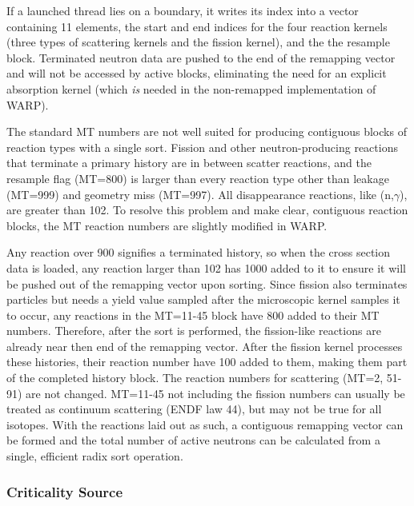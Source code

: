 If a launched thread lies on a boundary, it writes its index into a vector containing 11 elements, the start and end indices for the four reaction kernels (three types of scattering kernels and the fission kernel), and the the resample block.  Terminated neutron data are pushed to the end of the remapping vector and will not be accessed by active blocks, eliminating the need for an explicit absorption kernel (which \emph{is} needed in the non-remapped implementation of WARP).

The standard MT numbers are not well suited for producing contiguous blocks of reaction types with a single sort.  Fission and other neutron-producing reactions that terminate a primary history are in between scatter reactions, and the resample flag (MT=800) is larger than every reaction type other than leakage (MT=999) and geometry miss (MT=997).  All disappearance reactions, like (n,$\gamma$), are greater than 102.  To resolve this problem and make clear, contiguous reaction blocks, the MT reaction numbers are slightly modified in WARP.  

Any reaction over 900 signifies a terminated history, so when the cross section data is loaded, any reaction larger than 102 has 1000 added to it to ensure it will be pushed out of the remapping vector upon sorting.  Since fission also terminates particles but needs a yield value sampled after the microscopic kernel samples it to occur, any reactions in the MT=11-45 block have 800 added to their MT numbers.  Therefore, after the sort is performed, the fission-like reactions are already near then end of the remapping vector.  After the fission kernel processes these histories, their reaction number have 100 added to them, making them part of the completed history block.  The reaction numbers for scattering (MT=2, 51-91) are not changed. MT=11-45 not including the fission numbers can usually be treated as continuum scattering (ENDF law 44), but may not be true for all isotopes. With the reactions laid out as such, a contiguous remapping vector can be formed and the total number of active neutrons can be calculated from a single, efficient radix sort operation.  


\subsubsection{Criticality Source}

